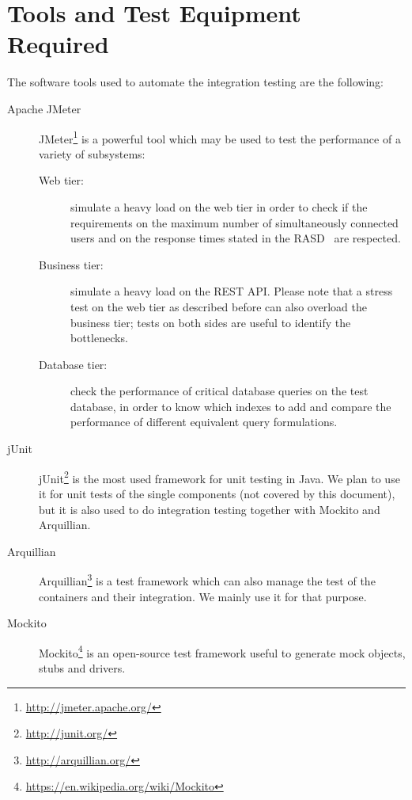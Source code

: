 \chapter{Tools and Test Equipment Required}
\label{chap:tools}

The software tools used to automate the integration testing are the following:
\begin{description}
    \item[Apache JMeter
    ]
    JMeter\footnote{\url{http://jmeter.apache.org/}} is a powerful tool which may be used to test the performance of a variety of subsystems:
    \begin{description}
        \item[Web tier:] simulate a heavy load on the web tier in order to check if the requirements on the maximum number of simultaneously connected users and on the response times stated in the RASD~\cite[p.~57]{mytaxi-rasd} are respected.
        \item[Business tier:] simulate a heavy load on the REST API. Please note that a stress test on the web tier as described before can also overload the business tier; tests on both sides are useful to identify the bottlenecks.
        \item[Database tier:] check the performance of critical database queries on the test database, in order to know which indexes to add and compare the performance of different equivalent query formulations.
    \end{description}

    \item[jUnit] jUnit\footnote{\url{http://junit.org/}} is the most used framework for unit testing in Java. We plan to use it for unit tests of the single components (not covered by this document), but it is also used to do integration testing together with Mockito and Arquillian.
    
    \item[Arquillian] Arquillian\footnote{\url{http://arquillian.org/}} is a test framework which can also manage the test of the containers and their integration. We mainly use it for that purpose.

    \item[Mockito] Mockito\footnote{\url{https://en.wikipedia.org/wiki/Mockito}} is an open-source test framework useful to generate mock objects, stubs and drivers.

\end{description}
